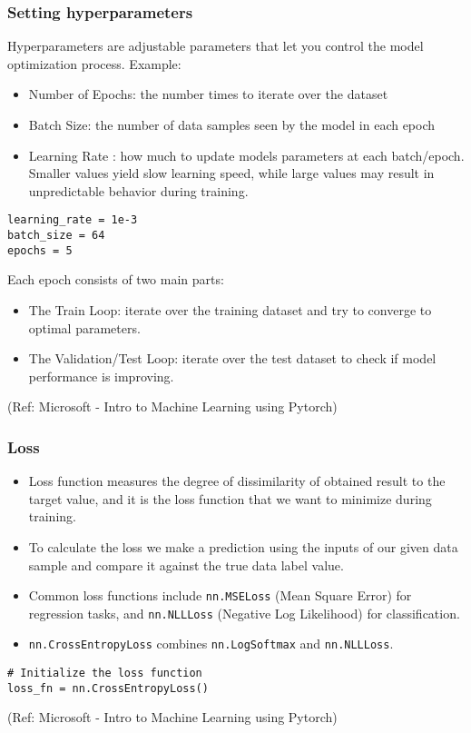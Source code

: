 \begin{frame}[fragile] \frametitle{Setting hyperparameters}

Hyperparameters are adjustable parameters that let you control the model optimization process. Example:

\begin{itemize}
\item Number of Epochs: the number times to iterate over the dataset
\item Batch Size: the number of data samples seen by the model in each epoch
\item Learning Rate : how much to update models parameters at each batch/epoch. Smaller values yield slow learning speed, while large values may result in unpredictable behavior during training.
\end{itemize}


\begin{lstlisting}
learning_rate = 1e-3
batch_size = 64
epochs = 5
\end{lstlisting}

Each epoch consists of two main parts:

\begin{itemize}
\item The Train Loop: iterate over the training dataset and try to converge to optimal parameters.
\item The Validation/Test Loop: iterate over the test dataset to check if model performance is improving.
\end{itemize}

\tiny{(Ref: Microsoft - Intro to Machine Learning using Pytorch)}
\end{frame}


\begin{frame}[fragile] \frametitle{Loss}


\begin{itemize}
\item Loss function measures the degree of dissimilarity of obtained result to the target value, and it is the loss function that we want to minimize during training. \item To calculate the loss we make a prediction using the inputs of our given data sample and compare it against the true data label value.
\item Common loss functions include \lstinline|nn.MSELoss| (Mean Square Error) for regression tasks, and \lstinline|nn.NLLLoss| (Negative Log Likelihood) for classification. 
\item \lstinline|nn.CrossEntropyLoss| combines \lstinline|nn.LogSoftmax| and \lstinline|nn.NLLLoss|.
\end{itemize}


\begin{lstlisting}
# Initialize the loss function
loss_fn = nn.CrossEntropyLoss()
\end{lstlisting}

\tiny{(Ref: Microsoft - Intro to Machine Learning using Pytorch)}
\end{frame}


